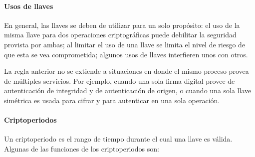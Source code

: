 %
%
%
%

\paragraph{Usos de llaves}

En general, las llaves se deben de utilizar para un solo propósito: el uso de
la misma llave para dos operaciones criptográficas puede debilitar la seguridad
provista por ambas; al limitar el uso de una llave se limita el nivel de riesgo
de que esta se vea comprometida; algunos usos de llaves interfieren unos
con otros.

La regla anterior no se extiende a situaciones en donde el mismo
proceso provea de múltiples servicios. Por ejemplo, cuando una sola firma
digital provee de autenticación de integridad y de autenticación de origen,
o cuando una sola llave simétrica es usada para cifrar y para autenticar en
una sola operación.

\paragraph{Criptoperiodos}

Un criptoperiodo es el rango de tiempo durante el cual una llave es válida.
Algunas de las funciones de los criptoperiodos son:


